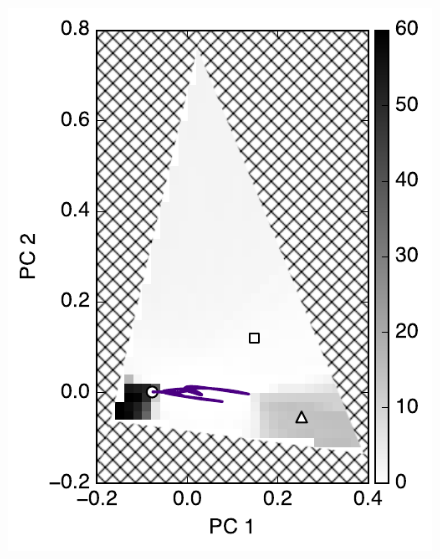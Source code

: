 \documentclass[iop,numberedappendix,apj]{emulateapj}
\begin{document}
\begin{figure}[tbh!]
\begin{minipage}{0.33\hsize}
\begin{center}
\includegraphics[width=\hsize]{mockdata_135deg_3types_t360_lc_noreg_allowedregion_gray.pdf}
    \end{center}
     \end{minipage}
   \begin{minipage}{0.33\hsize}
    \begin{center}

\end{center}
\end{minipage}
\end{figure}
\end{document}
